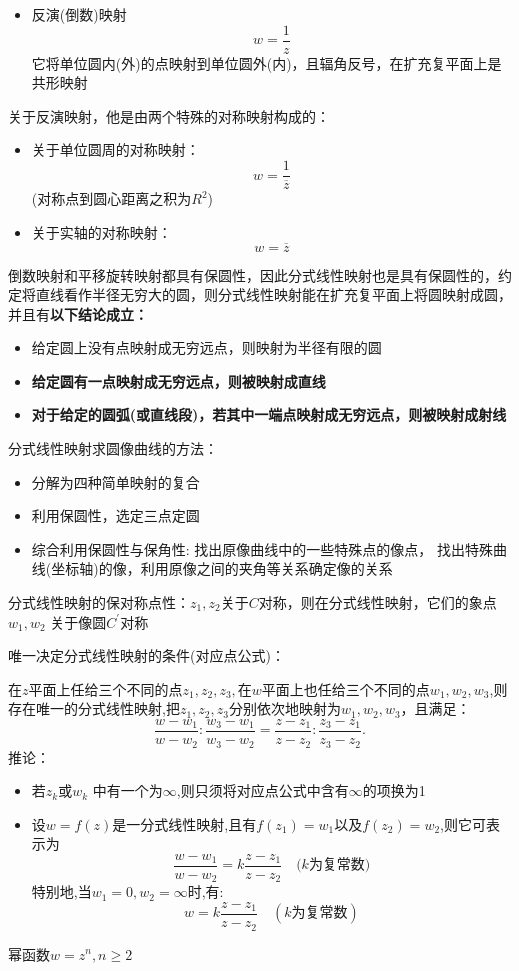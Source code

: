 \documentclass[a4paper,11pt,UTF8]{article}
\begin{document}
\begin{enumerate}
\begin{itemize}
		\item 反演(倒数)映射
		$$
		w=\frac1z
		$$
		它将单位圆内(外)的点映射到单位圆外(内)，且辐角反号，在扩充复平面上是共形映射
	\end{itemize}
	关于反演映射，他是由两个特殊的对称映射构成的：
	\begin{itemize}
		\item 关于单位圆周的对称映射：$$w=\frac1{\overline{z}}$$(对称点到圆心距离之积为$R^2$)
		\item 关于实轴的对称映射：$$w=\overline{z}$$
	\end{itemize}
	倒数映射和平移旋转映射都具有保圆性，因此分式线性映射也是具有保圆性的，约定将直线看作半径无穷大的圆，则分式线性映射能在扩充复平面上将圆映射成圆，并且有\textbf{以下结论成立：}
	\begin{itemize}
		\item 给定圆上没有点映射成无穷远点，则映射为半径有限的圆
		\item \textbf{给定圆有一点映射成无穷远点，则被映射成直线}
		\item \textbf{对于给定的圆弧(或直线段)，若其中一端点映射成无穷远点，则被映射成射线}
	\end{itemize}
	
		分式线性映射求圆像曲线的方法：
	\begin{itemize}
		\item 分解为四种简单映射的复合
		\item 利用保圆性，选定三点定圆
		\item  综合利用保圆性与保角性: 找出原像曲线中的一些特殊点的像点， 找出特殊曲线(坐标轴)的像，利用原像之间的夹角等关系确定像的关系
	\end{itemize}
	
	分式线性映射的保对称点性：$z_1,z_2$关于$C$对称，则在分式线性映射，它们的象点$w_1,w_2$ 关于像圆$C^\prime$对称
	
	唯一决定分式线性映射的条件(对应点公式)：
	
	在$z$平面上任给三个不同的点$z_1,z_2,z_3,$在$w$平面上也任给三个不同的点$w_1,w_2,w_3$,则存在唯一的分式线性映射,把$z_1,z_2,z_3$分别依次地映射为$w_1,w_2,w_3$，且满足：
	$$
	\frac{w-w_1}{w-w_2}:\frac{w_3-w_1}{w_3-w_2}=\frac{z-z_1}{z-z_2}:\frac{z_3-z_1}{z_3-z_2}.
	$$
	推论：
	\begin{itemize}
		\item 若$z_k$或$w_k$ 中有一个为$\infty$,则只须将对应点公式中含有$\infty$的项换为1
		\item  设$w=f(z)$是一分式线性映射,且有$f(z_1)=w_1$以及$f(z_2)=w_2$,则它可表示为
		$$
		\frac{w-w_1}{w-w_2}=k\frac{z-z_1}{z-z_2}\quad(k\text{为复常数)}
		$$
		特别地,当$w_1=0,w_2=\infty$时,有:
		$$
		w=k\frac{z-z_1}{z-z_2}\quad(k\text{为复常数})
		$$
	\end{itemize}
	幂函数$w=z^n,n\geq2$
	

\end{enumerate}
\end{document}

